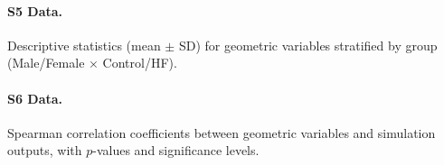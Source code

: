 \documentclass[10pt,letterpaper]{article}
\begin{document}
\paragraph{S5 Data.}
Descriptive statistics (mean $\pm$ SD) for geometric variables stratified by group
(Male/Female $\times$ Control/HF).

\paragraph{S6 Data.}
Spearman correlation coefficients between geometric variables and simulation outputs,
with $p$-values and significance levels.

\listofchanges
\end{document}
